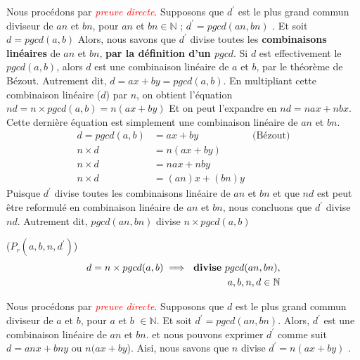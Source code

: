 \documentclass[16pt]{report}
\begin{document}
\begin{multicols*}{2}
    \begin{Preuve*}{}{}
        Nous procédons par \textcolor{red}{\textit{preuve directe}}. Supposons que $d^{\prime}$ est le 
        plus grand commun diviseur de $an$ et $bn$, pour $an$ et $bn \in \mathbb{N}$ ; $d^{\prime} = pgcd(an, bn)$ 
        . Et soit $d = pgcd(a,b)$ Alors, nous savons que \textcolor{myb}{$d^{\prime}$ divise toutes les 
        \textbf{combinaisons linéaires} de $an$ et $bn$}, \textbf{par la définition d'un $pgcd$}.
        Si $d$ est effectivement le $pgcd(a,b)$, alors $d$ est une combinaison linéaire de $a$ et $b$, 
        par le théorème de Bézout. Autrement dit, $d = ax + by = pgcd(a,b)$. En multipliant 
        cette combinaison linéaire ($d$) par $n$, on obtient l'équation $nd = n \times pgcd(a,b) = n(ax + by)$
        Et on peut l'expandre en \textcolor{myb}{$nd = nax + nbx$}. Cette dernière équation est simplement 
        une combinaison linéaire de $an$ et $bn$. 
        \begin{align*}
            d = pgcd(a,b) &= ax + by &\text{(Bézout)} \\ 
            n \times d &=  n(ax + by) \\ 
            n \times d &= nax + nby \\
            n \times d &= (an)x + (bn)y 
        \end{align*}
        Puisque $d^{\prime}$ divise toutes les combinaisons linéaire de $an$ et $bn$ et que 
        $nd$ est peut être reformulé en combinaison linéaire de $an$ et $bn$, nous concluons que 
        $d^{\prime}$ divise $nd$. Autrement dit, $pgcd(an ,bn)$ divise $n \times pgcd(a,b)$ 
    \end{Preuve*}

    \begin{prop}{($P_r(a,b, n, d^{\prime})$)}{}
    \begin{align*}
             d = n \times pgcd(a, b) \implies \text{ \textbf{divise} } pgcd(an, bn),
             \\ a, b, n, d \in \mathbb{N} 
    \end{align*}       
    \end{prop}


    \begin{Preuve*}{}{}
        Nous procédons par \textcolor{red}{\textit{preuve directe}}. Supposons que  $d$ est le 
        plus grand commun diviseur de $a$ et $b$, pour $a$ et $b$ $\in \mathbb{N}$. Et soit 
        $d^{\prime} = pgcd(an, bn)$. Alors, $d^{\prime}$ est une combinaison linéaire de 
        $an$ et $bn$. 
        et nous pouvons exprimer $d^{\prime}$ comme suit  $ d = anx + bny$ ou 
        \textcolor{myp}{$n(ax + by$)}.  Aisi, nous savons que $n$ divise $d^{\prime} = n(ax + by)$ \vspace{1em}. \\ 


\end{Preuve*}
\end{multicols*}
\end{document}

